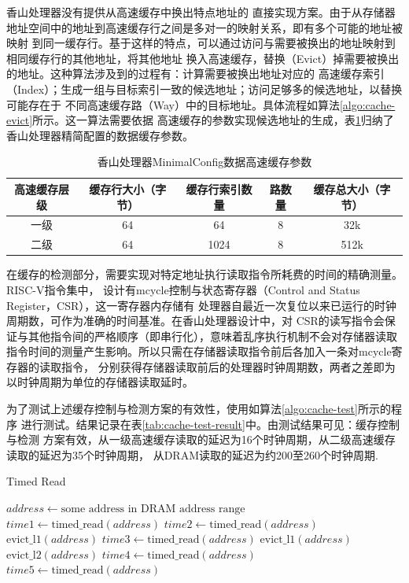 香山处理器没有提供从高速缓存中换出特点地址的
直接实现方案。由于从存储器地址空间中的地址到高速缓存行之间是多对一的映射关系，即有多个可能的地址被映射
到同一缓存行。基于这样的特点，可以通过访问与需要被换出的地址映射到相同缓存行的其他地址，将其他地址
换入高速缓存，替换（Evict）掉需要被换出的地址。这种算法涉及到的过程有：计算需要被换出地址对应的
高速缓存索引（Index）；生成一组与目标索引一致的候选地址；访问足够多的候选地址，以替换可能存在于
不同高速缓存路（Way）中的目标地址。具体流程如算法\ref{algo:cache-evict}所示。这一算法需要依据
高速缓存的参数实现候选地址的生成，表\ref{tab:cache-param}归纳了香山处理器精简配置的数据缓存参数。

\begin{table}[!ht]
	\centering
\begin{threeparttable}[b]
\caption{香山处理器MinimalConfig数据高速缓存参数}
\begin{tabular}{ccccc}
	\toprule
	高速缓存层级 & 缓存行大小（字节） & 缓存行索引数量 & 路数量 & 缓存总大小（字节） \\
	\midrule
	一级 & 64 & 64 & 8 & 32k \\
	二级 & 64 & 1024 & 8 & 512k \\
	\bottomrule
\end{tabular}
\label{tab:cache-param}
\end{threeparttable}
\end{table}

在缓存的检测部分，需要实现对特定地址执行读取指令所耗费的时间的精确测量。RISC-V指令集中，
设计有mcycle控制与状态寄存器（Control and Status Register，CSR），这一寄存器内存储有
处理器自最近一次复位以来已运行的时钟周期数，可作为准确的时间基准。在香山处理器设计中，对
CSR的读写指令会保证与其他指令间的严格顺序（即串行化），意味着乱序执行机制不会对存储器读取
指令时间的测量产生影响。所以只需在存储器读取指令前后各加入一条对mcycle寄存器的读取指令，
分别获得存储器读取前后的处理器时钟周期数，两者之差即为以时钟周期为单位的存储器读取延时。

为了测试上述缓存控制与检测方案的有效性，使用如算法\ref{algo:cache-test}所示的程序
进行测试。结果记录在表\ref{tab:cache-test-result}中。由测试结果可见：缓存控制与检测
方案有效，从一级高速缓存读取的延迟为16个时钟周期，从二级高速缓存读取的延迟为35个时钟周期，
从DRAM读取的延迟为约200至260个时钟周期.

\begin{breakablealgorithm}
	\caption{Timed Read}\label{algo:cache-test}
	\begin{algorithmic}[1]
			\State $address \gets \text{some address in DRAM address range}$
			\State $time1 \gets \text{timed\_read}(address)$
			\State $time2 \gets \text{timed\_read}(address)$
			\State $\text{evict\_l1}(address)$
			\State $time3 \gets \text{timed\_read}(address)$
			\State $\text{evict\_l1}(address)$
			\State $\text{evict\_l2}(address)$
			\State $time4 \gets \text{timed\_read}(address)$
			\State $time5 \gets \text{timed\_read}(address)$
		\EndFunction
	\end{algorithmic}
\end{breakablealgorithm}

